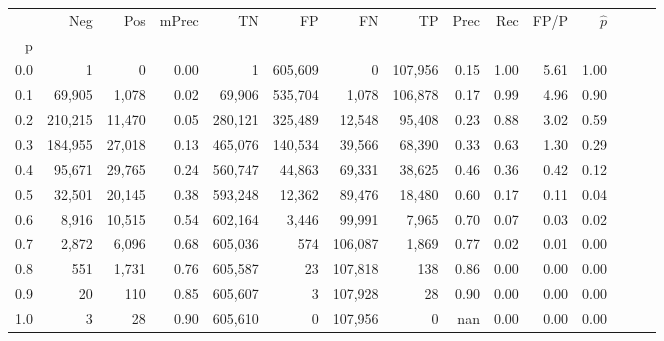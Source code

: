 \begin{tabular}{rrrrrrrrrrrrrrr}
\toprule
{} &      Neg &     Pos & mPrec &       TN &       FP &       FN &       TP &  Prec &   Rec &  FP/P & $\hat{p}$ \\
p   &          &         &       &          &          &          &          &       &       &       &           \\
\midrule
0.0 &        1 &       0 &  0.00 &        1 &  605,609 &        0 &  107,956 &  0.15 &  1.00 &  5.61 &      1.00 \\
0.1 &   69,905 &   1,078 &  0.02 &   69,906 &  535,704 &    1,078 &  106,878 &  0.17 &  0.99 &  4.96 &      0.90 \\
0.2 &  210,215 &  11,470 &  0.05 &  280,121 &  325,489 &   12,548 &   95,408 &  0.23 &  0.88 &  3.02 &      0.59 \\
0.3 &  184,955 &  27,018 &  0.13 &  465,076 &  140,534 &   39,566 &   68,390 &  0.33 &  0.63 &  1.30 &      0.29 \\
0.4 &   95,671 &  29,765 &  0.24 &  560,747 &   44,863 &   69,331 &   38,625 &  0.46 &  0.36 &  0.42 &      0.12 \\
0.5 &   32,501 &  20,145 &  0.38 &  593,248 &   12,362 &   89,476 &   18,480 &  0.60 &  0.17 &  0.11 &      0.04 \\
0.6 &    8,916 &  10,515 &  0.54 &  602,164 &    3,446 &   99,991 &    7,965 &  0.70 &  0.07 &  0.03 &      0.02 \\
0.7 &    2,872 &   6,096 &  0.68 &  605,036 &      574 &  106,087 &    1,869 &  0.77 &  0.02 &  0.01 &      0.00 \\
0.8 &      551 &   1,731 &  0.76 &  605,587 &       23 &  107,818 &      138 &  0.86 &  0.00 &  0.00 &      0.00 \\
0.9 &       20 &     110 &  0.85 &  605,607 &        3 &  107,928 &       28 &  0.90 &  0.00 &  0.00 &      0.00 \\
1.0 &        3 &      28 &  0.90 &  605,610 &        0 &  107,956 &        0 &   nan &  0.00 &  0.00 &      0.00 \\
\bottomrule
\end{tabular}
